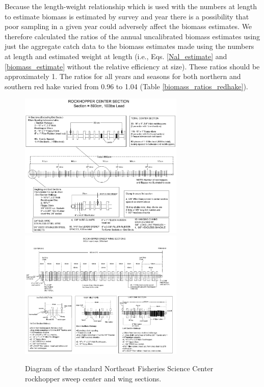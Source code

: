 \documentclass[12pt,letterpaper, leqno]{article}
\begin{document}
Because the length-weight relationship which is used with the numbers at length to estimate biomass is estimated by survey and year there is a possibility that poor sampling in a given year could adversely affect the biomass estimates.  We therefore calculated the ratios of the annual uncalibrated biomass estimates using just the aggregate catch data to the biomass estimates made using the numbers at length and estimated weight at length (i.e., Eqs. \ref{Nal_estimate} and \ref{biomass_estimate} without the relative efficiency at size). These ratios should be approximately 1. The ratios for all years and seasons for both northern and southern red hake varied from 0.96 to 1.04 (Table \ref{biomass_ratios_redhake}).





\clearpage

\begin{figure}
\caption{Diagram of the standard Northeast Fisheries Science Center rockhopper sweep center and wing sections.}\label{rockhopper_schematic}
\begin{center}
\includegraphics[width = 0.7\textwidth]{rockhopper_schematic_1.pdf}
\includegraphics[width = 0.7\textwidth]{rockhopper_schematic_2.pdf}
\end{center}
\end{figure}
\clearpage
\end{document}
